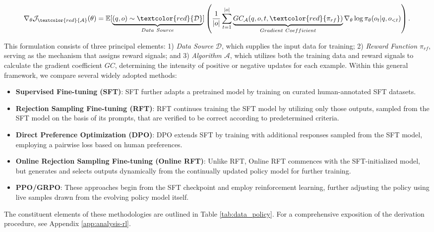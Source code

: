 \begin{equation}
    \nabla_{\theta}\mathcal{J}_{\textcolor{red}{\mathcal{A}}}(\theta) = \mathbb{E}[\underbrace{(q,o) \sim \textcolor{red}{\mathcal{D}}}_{Data \ Source}]\left( \frac{1}{|o|} \sum_{t=1}^{|o|}  \underbrace{GC_{{\mathcal{A}}}(q, o, t, \textcolor{red}{\pi_{{rf}}})}_{Gradient \ Coefficient}  \nabla_{\theta}\log \pi_{\theta}(o_t | q, o_{<t})\right).
\label{eq:objective}
\end{equation}

This formulation consists of three principal elements: 1) \textit{Data Source $\mathcal{D}$}, which supplies the input data for training; 2) \textit{Reward Function $\pi_{{rf}}$}, serving as the mechanism that assigns reward signals; and 3) \textit{Algorithm $\mathcal{A}$}, which utilizes both the training data and reward signals to calculate the gradient coefficient $GC$, determining the intensity of positive or negative updates for each example. Within this general framework, we compare several widely adopted methods:

\begin{itemize}
    \item \textbf{Supervised Fine-tuning (SFT)}: SFT further adapts a pretrained model by training on curated human-annotated SFT datasets.
    \item \textbf{Rejection Sampling Fine-tuning (RFT)}: RFT continues training the SFT model by utilizing only those outputs, sampled from the SFT model on the basis of its prompts, that are verified to be correct according to predetermined criteria.
    \item \textbf{Direct Preference Optimization (DPO)}: DPO extends SFT by training with additional responses sampled from the SFT model, employing a pairwise loss based on human preferences.
    \item \textbf{Online Rejection Sampling Fine-tuning (Online RFT)}: Unlike RFT, Online RFT commences with the SFT-initialized model, but generates and selects outputs dynamically from the continually updated policy model for further training.
    \item \textbf{PPO/GRPO}: These approaches begin from the SFT checkpoint and employ reinforcement learning, further adjusting the policy using live samples drawn from the evolving policy model itself.
\end{itemize}

The constituent elements of these methodologies are outlined in Table \ref{tab:data_policy}. For a comprehensive exposition of the derivation procedure, see Appendix \ref{app:analysis-rl}.

